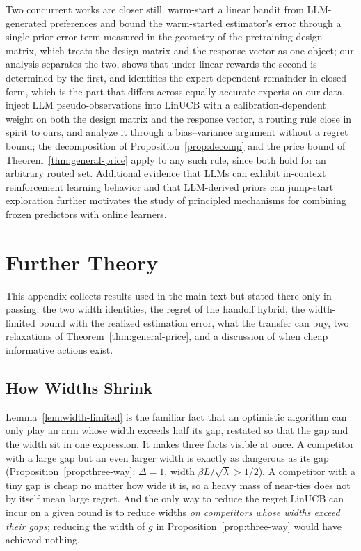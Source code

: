 \documentclass[anon]{alt2027} %
\begin{document}
Two concurrent works are closer still. \citet{jumpstart2026} warm-start a linear
bandit from LLM-generated preferences and bound the warm-started estimator's
error through a single prior-error term measured in the geometry of the
pretraining design matrix, which treats the design matrix and the response
vector as one object; our analysis separates the two, shows that under linear
rewards the second is determined by the first, and identifies the
expert-dependent remainder in closed form, which is the part that differs
across equally accurate experts on our data. \citet{calibgated2026} inject LLM
pseudo-observations into LinUCB with a calibration-dependent weight on both the
design matrix and the response vector, a routing rule close in spirit to ours,
and analyze it through a bias--variance argument without a regret bound; the
decomposition of Proposition~\ref{prop:decomp} and the price bound of
Theorem~\ref{thm:general-price} apply to any such rule, since both hold for an
arbitrary routed set. Additional evidence that LLMs can
exhibit in-context reinforcement learning behavior
\citep{monea2024llms,krishnamurthy2024can} and that LLM-derived priors can
jump-start exploration \citep{alamdari2024jumpstarting,abbasiyadkori2024believe}
further motivates the study of principled mechanisms for combining frozen
predictors with online learners.


\section{Further Theory}
\label{app:extra-theory}

This appendix collects results used in the main text but stated there only in
passing: the two width identities, the regret of the handoff hybrid, the
width-limited bound with the realized estimation error, what the transfer can
buy, two relaxations of Theorem~\ref{thm:general-price}, and a discussion of
when cheap informative actions exist.

\subsection{How Widths Shrink}
\label{app:widths}

Lemma~\ref{lem:width-limited} is the familiar fact that an optimistic algorithm can only play an
arm whose width exceeds half its gap, restated so that the gap and the width
sit in one expression. It makes three facts visible at once. A competitor with
a large gap but an even larger width is exactly as dangerous as its gap
(Proposition~\ref{prop:three-way}: $\Delta=1$, width $\beta L/\sqrt\lambda>1/2$).
A competitor with a tiny gap is cheap no matter how wide it is, so a heavy
mass of near-ties does not by itself mean large regret. And the only way to
reduce the regret LinUCB can incur on a given round is to reduce widths
\emph{on competitors whose widths exceed their gaps}; reducing the width of
$g$ in Proposition~\ref{prop:three-way} would have achieved nothing.
\end{document}
